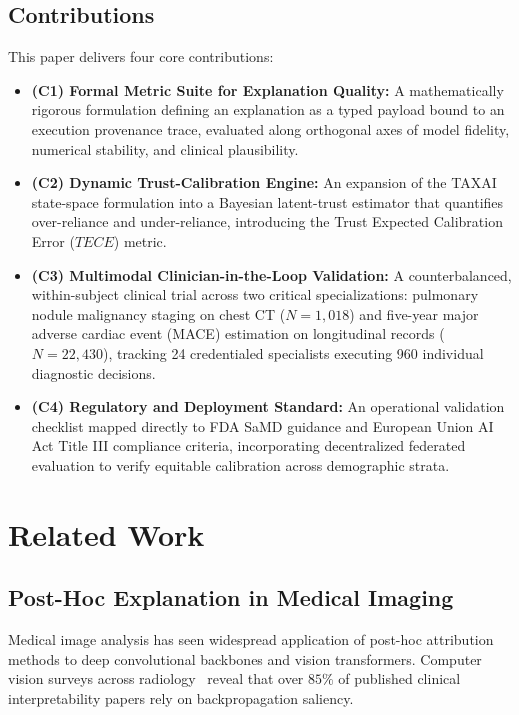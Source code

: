 \documentclass[10pt,journal,compsoc]{IEEEtran}
\begin{document}
\subsection{Contributions}
This paper delivers four core contributions:
\begin{itemize}
    \item \textbf{(C1) Formal Metric Suite for Explanation Quality:} A mathematically rigorous formulation defining an explanation as a typed payload bound to an execution provenance trace, evaluated along orthogonal axes of model fidelity, numerical stability, and clinical plausibility.
    \item \textbf{(C2) Dynamic Trust-Calibration Engine:} An expansion of the TAXAI state-space formulation into a Bayesian latent-trust estimator that quantifies over-reliance and under-reliance, introducing the Trust Expected Calibration Error ($TECE$) metric.
    \item \textbf{(C3) Multimodal Clinician-in-the-Loop Validation:} A counterbalanced, within-subject clinical trial across two critical specializations: pulmonary nodule malignancy staging on chest CT ($N = 1,018$) and five-year major adverse cardiac event (MACE) estimation on longitudinal records ($N = 22,430$), tracking 24 credentialed specialists executing 960 individual diagnostic decisions.
    \item \textbf{(C4) Regulatory and Deployment Standard:} An operational validation checklist mapped directly to FDA SaMD guidance and European Union AI Act Title III compliance criteria, incorporating decentralized federated evaluation to verify equitable calibration across demographic strata.
\end{itemize}

\section{Related Work}

\subsection{Post-Hoc Explanation in Medical Imaging}
Medical image analysis has seen widespread application of post-hoc attribution methods to deep convolutional backbones and vision transformers. Computer vision surveys across radiology~\cite{varoquaux2025computer} reveal that over $85\%$ of published clinical interpretability papers rely on backpropagation saliency. 
\end{document}
